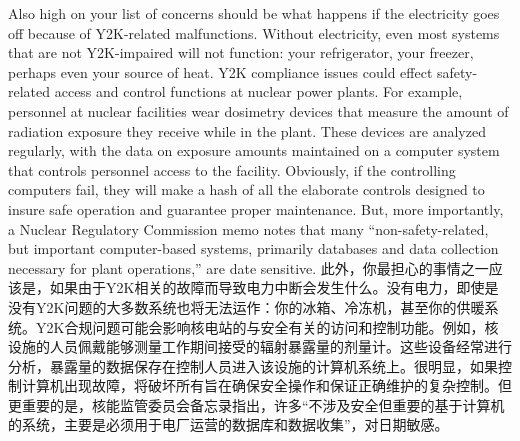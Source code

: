 \begin{Parallel}{97mm}{45mm}
  \ParallelLText
  {Also high on your list of concerns should be what happens if the electricity goes off because of Y2K-related malfunctions. Without electricity, even most systems that are not Y2K-impaired will not function: your refrigerator, your freezer, perhaps even your source of heat. Y2K compliance issues could effect safety-related access and control functions at nuclear power plants. For example, personnel at nuclear facilities wear dosimetry devices that measure the amount of radiation exposure they receive while in the plant. These devices are analyzed regularly, with the data on exposure amounts maintained on a computer system that controls personnel access to the facility. Obviously, if the controlling computers fail, they will make a hash of all the elaborate controls designed to insure safe operation and guarantee proper maintenance. But, more importantly, a Nuclear Regulatory Commission memo notes that many “non-safety-related, but important computer-based systems, primarily databases and data collection necessary for plant operations,” are date sensitive.}  
  \ParallelRText
  {\small 此外，你最担心的事情之一应该是，如果由于Y2K相关的故障而导致电力中断会发生什么。没有电力，即使是没有Y2K问题的大多数系统也将无法运作：你的冰箱、冷冻机，甚至你的供暖系统。Y2K合规问题可能会影响核电站的与安全有关的访问和控制功能。例如，核设施的人员佩戴能够测量工作期间接受的辐射暴露量的剂量计。这些设备经常进行分析，暴露量的数据保存在控制人员进入该设施的计算机系统上。很明显，如果控制计算机出现故障，将破坏所有旨在确保安全操作和保证正确维护的复杂控制。但更重要的是，核能监管委员会备忘录指出，许多“不涉及安全但重要的基于计算机的系统，主要是必须用于电厂运营的数据库和数据收集”，对日期敏感。}
  \ParallelPar



\end{Parallel}
